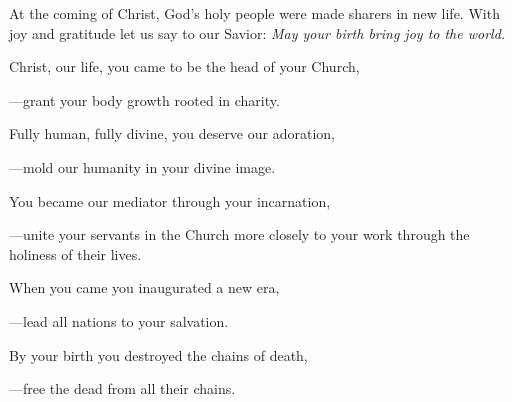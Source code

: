 \intercessions\indent

\begin{hangpar}

At the coming of Christ, God's holy people were made sharers in new life. With joy and gratitude let us say to our Savior:
\emph{May your birth bring joy to the world.}

\medskip Christ, our life, you came to be the head of your Church,

{\color{red}---\thinspace}grant your body growth rooted in charity.

\medskip Fully human, fully divine, you deserve our adoration,

{\color{red}---\thinspace}mold our humanity in your divine image.

\medskip You became our mediator through your incarnation,

{\color{red}---\thinspace}unite your servants in the Church more closely to your work through the holiness of their lives.

\medskip When you came you inaugurated a new era,

{\color{red}---\thinspace}lead all nations to your salvation.

\medskip By your birth you destroyed the chains of death,

{\color{red}---\thinspace}free the dead from all their chains.

\medskip

\end{hangpar}
